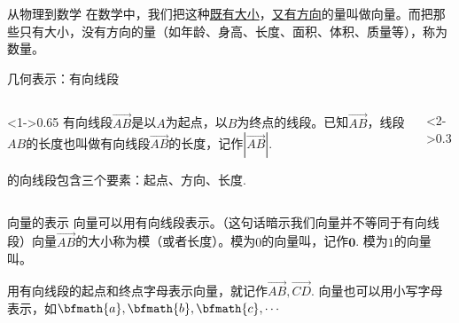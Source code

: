 \documentclass[mathserif,blue]{beamer}
\newcommand\colorwordsa[1]{\textcolor[rgb]{0,.63,.91}{\small\heiti#1}}%
\newcommand\colorwordsb[1]{\textcolor[rgb]{.75,.53,.21}{\small\heiti#1}}%
\begin{document}
\begin{frame}{从物理到数学}
在数学中，我们把这种\underline{既有大小}，\underline{又有方向}的量叫做\colorwordsa{向量}。而把那些只有大小，没有方向的量（如年龄、身高、长度、面积、体积、质量等），称为\colorwordsa{数量}。
\end{frame}

\begin{frame}{几何表示：有向线段}
\begin{columns}\begin{column}<1->{0.65\textwidth}
  \colorwordsa{有向线段}$\overrightarrow{AB}$是以$A$为起点，以$B$为终点的线段。已知$\overrightarrow{AB}$，线段$AB$的长度也叫做有向线段$\overrightarrow{AB}$的长度，记作$|\overrightarrow{AB}|$. \par
的向线段包含三个要素：\colorwordsb{起点、方向、长度}.
\end{column}\begin{column}<2->{0.3\textwidth}
\end{column}\end{columns}
\end{frame}

\begin{frame}{向量的表示}
  向量可以用有向线段表示。（这句话暗示我们向量并不等同于有向线段）向量$\overrightarrow{AB}$的大小称为\colorwordsa{模}（或者\colorwordsa{长度}）。模为$0$的向量叫，记作$\mathbf{0}$. 模为$1$的向量叫。\par
  用有向线段的起点和终点字母表示向量，就记作$\overrightarrow{AB},\overrightarrow{CD}$. 向量也可以用小写字母表示，如$\bfmath{a},\bfmath{b},\bfmath{c},\cdots$
\end{frame}
\end{document}
